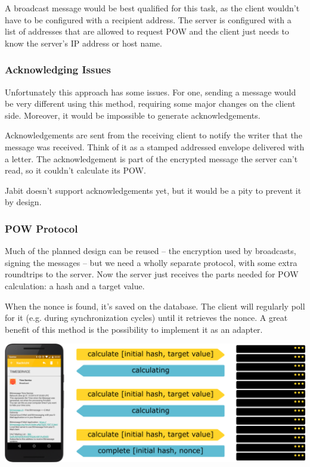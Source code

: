 \documentclass{bfh}
\begin{document}
  A broadcast message would be best qualified for this task, as the client wouldn't have to be configured with a recipient address. The server is configured with a list of addresses that are allowed to request \ac{POW} and the client just needs to know the server's IP address or host name.

  \subsubsection{Acknowledging Issues}
  Unfortunately this approach has some issues. For one, sending a message would be very different using this method, requiring some major changes on the client side. Moreover, it would be impossible to generate acknowledgements.

  Acknowledgements are sent from the receiving client to notify the writer that the message was received. Think of it as a stamped addressed envelope delivered with a letter. The acknowledgement is part of the encrypted message the server can't read, so it couldn't calculate its \ac{POW}.

  Jabit doesn't support acknowledgements yet, but it would be a pity to prevent it by design.

  \subsubsection{\ac{POW} Protocol}
  Much of the planned design can be reused -- the encryption used by broadcasts, signing the messages -- but we need a wholly separate protocol, with some extra roundtrips to the server. Now the server just receives the parts needed for \ac{POW} calculation: a hash and a target value.

  When the nonce is found, it's saved on the database. The client will regularly poll for it (e.g. during synchronization cycles) until it retrieves the nonce. A great benefit of this method is the possibility to implement it as an adapter.

  \includegraphics[width=\textwidth]{images/server_pow_protocol.pdf}
\end{document}
